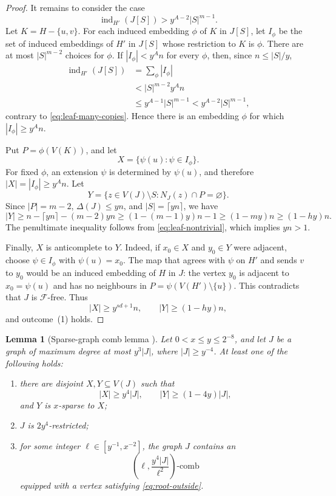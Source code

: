 \documentclass[11pt]{article}
\numberwithin{equation}{section}
\theoremstyle{plain}
\newtheorem{lemma}[theorem]{Lemma}
\theoremstyle{definition}
\begin{document}
\begin{proof}
It remains to consider the case
\begin{equation}
 \operatorname{ind}_{H'}(J[S])
       >y^{A-2}|S|^{m-1}.
\label{eq:leaf-many-copies}
\end{equation}
Let $K=H-\{u,v\}$.  For each induced embedding $\phi$ of $K$ in
$J[S]$, let $I_\phi$ be the set of induced embeddings of $H'$ in
$J[S]$ whose restriction to $K$ is $\phi$.  There are at most
$|S|^{m-2}$ choices for $\phi$.  If $|I_\phi|<y^An$ for every $\phi$,
then, since $n\leq|S|/y$,
\begin{align*}
 \operatorname{ind}_{H'}(J[S])
   &=\sum_\phi |I_\phi|\\
   &<|S|^{m-2}y^An\\
   &\leq y^{A-1}|S|^{m-1}
    <y^{A-2}|S|^{m-1},
\end{align*}
contrary to \eqref{eq:leaf-many-copies}.  Hence there is an embedding
$\phi$ for which $|I_\phi|\geq y^An$.

Put $P=\phi(V(K))$, and let
\[
                    X=\{\psi(u):\psi\in I_\phi\}.
\]
For fixed $\phi$, an extension $\psi$ is determined by $\psi(u)$, and
therefore $|X|=|I_\phi|\geq y^An$.  Let
\[
 Y=\{z\in V(J)\setminus S:N_J(z)\cap P=\varnothing\}.
\]
Since $|P|=m-2$, $\Delta(J)\leq yn$, and
$|S|=\lceil yn\rceil$, we have
\[
 |Y|\geq n-\lceil yn\rceil-(m-2)yn
     \geq(1-(m-1)y)n-1
     \geq(1-my)n
     \geq(1-hy)n.
\]
The penultimate inequality follows from
\eqref{eq:leaf-nontrivial}, which implies $yn>1$.

Finally, $X$ is anticomplete to $Y$.  Indeed, if $x_0\in X$ and
$y_0\in Y$ were adjacent, choose $\psi\in I_\phi$ with
$\psi(u)=x_0$.  The map that agrees with $\psi$ on $H'$ and sends $v$
to $y_0$ would be an induced embedding of $H$ in $J$: the vertex
$y_0$ is adjacent to $x_0=\psi(u)$ and has no neighbours in
$P=\psi(V(H')\setminus\{u\})$.  This contradicts that $J$ is
$\mathcal F$-free.  Thus
\[
 |X|\geq y^{sd+1}n,\qquad |Y|\geq(1-hy)n,
\]
and outcome~(1) holds.
\end{proof}

\begin{lemma}[Sparse-graph comb lemma
{\cite[Lemma~2.10]{HuangJuZhou2026}}]
\label{lem:hjz-sparse-comb}
Let $0<x\leq y\leq2^{-8}$, and let $J$ be a graph of maximum degree at
most $y^3|J|$, where $|J|\geq y^{-4}$.  At least one of the following
holds:
\begin{enumerate}
\item there are disjoint $X,Y\subseteq V(J)$ such that
\[
 |X|\geq y^4|J|,\qquad |Y|\geq(1-4y)|J|,
\]
and $Y$ is $x$-sparse to $X$;
\item $J$ is $2y^4$-restricted;
\item for some integer $\ell\in[y^{-1},x^{-2}]$, the graph $J$
contains an
\[
               \left(\ell,\frac{y^4|J|}{\ell^2}\right)\text{-comb}
\]
equipped with a vertex satisfying \eqref{eq:root-outside}.
\end{enumerate}
\end{lemma}
\end{document}
